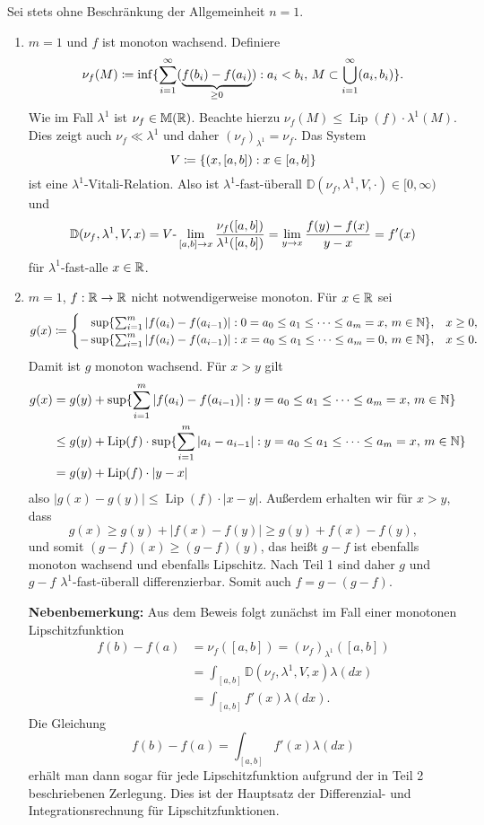 \documentclass[a4paper,twoside,DIV15,BCOR12mm]{scrbook}
\DeclareMathOperator{\Lip}{Lip}
\begin{document}
\begin{beweis}
Sei stets ohne Beschränkung der Allgemeinheit $n=1$.
\begin{enumerate}[{Teil} 1:]
\item $m=1$ und $f$ ist monoton wachsend. Definiere
\[
\nu_f(M) \da \inf\{\sum_{i=1}^\infty (\underbrace{f(b_i) - f(a_i)}_{\ge 0}): a_i < b_i,\, M\subset \bigcup_{i=1}^\infty (a_i,b_i)\}.
\]
Wie im Fall $\lambda^1$ ist $\nu_f\in\mathbb M (\mathbb{R})$. Beachte hierzu $\nu_f(M) \le \Lip(f) \cdot \lambda^1(M)$. Dies zeigt auch $\nu_f \ll \lambda^1$ und daher $(\nu_f)_{\lambda^1} = \nu_f$. Das System
\[
V \da \{ (x,[a,b]): x\in[a,b]\}
\]
ist eine $\lambda^1$-Vitali-Relation. Also ist $\lambda^1$-fast-überall $\mathbb D(\nu_f,\lambda^1,V,\cdot) \in [0,\infty)$  und
\[
\mathbb D(\nu_f,\lambda^1,V,x)
= V\text-\lim_{[a,b]\to x} \frac{\nu_f([a,b])}{\lambda^1([a,b])}
= \lim_{y\to x} \frac{f(y) - f(x) }{y-x} = f'(x)
\]
für $\lambda^1$-fast-alle $x\in\mathbb{R}$.

\item $m=1$, $f:\mathbb{R}\to\mathbb{R}$ nicht notwendigerweise monoton. Für $x\in \mathbb{R}$ sei
\[
g(x) \da 
\begin{cases}
\phantom{-}\sup\{\sum_{i=1}^m|f(a_i)-f(a_{i-1})| : 0 = a_0 \le a_1 \le \cdots \le a_m = x, \, m\in\MdN\}, & x\ge 0,\\
-\sup\{\sum_{i=1}^m|f(a_i)-f(a_{i-1})| : x = a_0 \le a_1 \le \cdots \le a_m = 0, \, m\in\MdN\}, & x\le 0.
\end{cases}
\]
Damit ist $g$ monoton wachsend. Für $x>y$ gilt
\begin{align*}
g(x)
&= g(y) + \sup\{\sum_{i=1}^m |f(a_i) - f(a_{i-1})|: y = a_0\le a_1\le \cdots \le a_m = x,\, m\in\MdN\} \\
&\le g(y) + \Lip(f) \cdot \sup\{\sum_{i=1}^m |a_i-a_{i-1}|: y = a_0\le a_1\le \cdots \le a_m = x,\, m\in\MdN\} \\
&= g(y) + \Lip(f) \cdot |y-x|
\end{align*}
also $|g(x) - g(y)| \le \Lip(f) \cdot |x-y|$. Außerdem erhalten wir für $x>y$, dass
\[
g(x)\ge g(y) + |f(x)-f(y)| \ge g(y) + f(x) - f(y),
\]
und somit $(g-f)(x) \ge (g-f)(y)$, das heißt $g-f$ ist ebenfalls monoton wachsend und ebenfalls Lipschitz. Nach Teil 1 sind daher $g$ und $g-f$ $\lambda^1$-fast-überall differenzierbar. Somit auch $f=g-(g-f)$.

\textbf{Nebenbemerkung:} Aus dem Beweis folgt zunächst im Fall einer monotonen Lipschitzfunktion 
\begin{align*}
f(b)-f(a) &= \nu_f([a,b]) = (\nu_f)_{\lambda^1}([a,b])\\
& = \int_{[a,b]} \mathbb D(\nu_f, \lambda^1, V, x)\lambda(dx)\\
& = \int_{[a,b]} f'(x) \lambda(dx).
\end{align*}
Die Gleichung
$$
f(b)-f(a)= \int_{[a,b]} f'(x) \lambda(dx)
$$
erhält man dann sogar für jede Lipschitzfunktion aufgrund der in Teil 2 beschriebenen Zerlegung. 
Dies ist der Hauptsatz der Differenzial- und Integrationsrechnung für Lipschitzfunktionen.


\end{enumerate}
\end{beweis}
\end{document}
